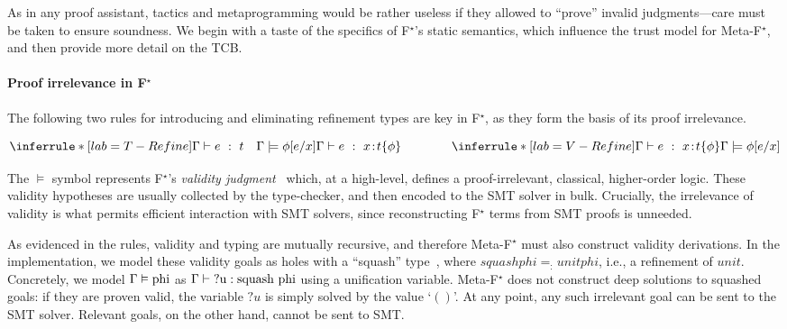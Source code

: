 \documentclass[runningheads]{llncs}
\newcommand{\kw}[1]{\text{\ls|#1|}}
\newcommand\Goal[3]{\mbox{\ensuremath{#1 \vdash \kw{#2} : \kw{#3}}\xspace}}
\newcommand\VGoal[2]{\mbox{\ensuremath{#1 \vDash \kw{#2}}\xspace}}
\newcommand\fstar{F$^\star$\xspace}
\newcommand\metafstar{Meta-F$^\star$\xspace}
\newcommand{\comm}[3]{\ifcheckpagebudget\else\ifdraft{{\color{#1}[#2: #3]}}\fi\fi}
\newcommand{\guido}[1]{\comm{blue}{Guido}{#1}}
\begin{document}
As in any proof assistant,
tactics and metaprogramming would be rather useless if
they allowed to ``prove'' invalid judgments---care must be taken to ensure soundness.
%
We begin with a taste of the specifics of \fstar's static
semantics, which influence the trust model for \metafstar, and then
provide more detail on the TCB.

\paragraph{\bf Proof irrelevance in \fstar}
The following two rules for introducing and eliminating refinement types
are key in \fstar, as they form the basis of its
proof irrelevance.

\[
   \inferrule*[lab=T-Refine]
   {
     \Gamma |- e ~:~ t \quad
     \Gamma |= \phi[e/x]
   }
   {
     \Gamma |- e ~:~ x\!:\!t\{\phi\}
   }
   \qquad
   \qquad
   \inferrule*[lab=V-Refine]
   {
     \Gamma |- e ~:~ x\!:\!t\{\phi\}
   }
   {
     \Gamma |= \phi[e/x]
   }
\]

The $\vDash$ symbol represents \fstar's \emph{validity judgment}~\cite{dm4free}
which, at a high-level, defines a proof-irrelevant,
classical, higher-order logic.
%
These validity hypotheses are usually collected by the type-checker, and
then encoded to the SMT solver in bulk.
%
Crucially, the irrelevance of validity is what permits
efficient interaction with SMT solvers, since
reconstructing \fstar terms from SMT proofs is unneeded.

As evidenced in the rules, validity and typing are mutually recursive,
and therefore \metafstar must also construct validity derivations.
%
In the implementation, we model these validity goals as
holes with a ``squash'' type~\citep{Nogin02,AwodeyBauer},
where \ls$squash phi = _:unit{phi}$, i.e., a refinement of \ls$unit$.
%
Concretely, we model \VGoal{\Gamma}{phi} as \Goal{\Gamma}{?u}{squash phi} using 
a unification variable.
%
\metafstar does not construct deep solutions to squashed goals: if they
are proven valid, the variable \ls$?u$ is simply solved by the  value `\ls$()$'.
%
At any point, any such irrelevant goal can be sent to the SMT solver.
%
Relevant goals, on the other hand, cannot be sent to SMT.

\end{document}
